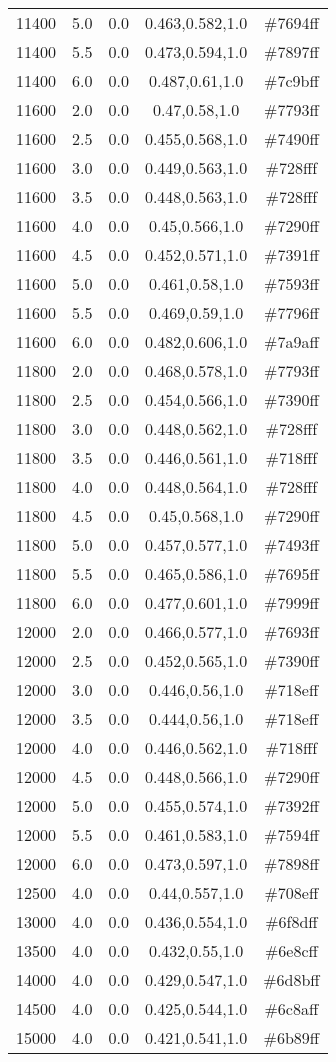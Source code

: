\begin{tabular}{ccccc}
11400 & 5.0 & 0.0 & 0.463,0.582,1.0 & \#7694ff \\ 
11400 & 5.5 & 0.0 & 0.473,0.594,1.0 & \#7897ff \\ 
11400 & 6.0 & 0.0 & 0.487,0.61,1.0 & \#7c9bff \\ 
11600 & 2.0 & 0.0 & 0.47,0.58,1.0 & \#7793ff \\ 
11600 & 2.5 & 0.0 & 0.455,0.568,1.0 & \#7490ff \\ 
11600 & 3.0 & 0.0 & 0.449,0.563,1.0 & \#728fff \\ 
11600 & 3.5 & 0.0 & 0.448,0.563,1.0 & \#728fff \\ 
11600 & 4.0 & 0.0 & 0.45,0.566,1.0 & \#7290ff \\ 
11600 & 4.5 & 0.0 & 0.452,0.571,1.0 & \#7391ff \\ 
11600 & 5.0 & 0.0 & 0.461,0.58,1.0 & \#7593ff \\ 
11600 & 5.5 & 0.0 & 0.469,0.59,1.0 & \#7796ff \\ 
11600 & 6.0 & 0.0 & 0.482,0.606,1.0 & \#7a9aff \\ 
11800 & 2.0 & 0.0 & 0.468,0.578,1.0 & \#7793ff \\ 
11800 & 2.5 & 0.0 & 0.454,0.566,1.0 & \#7390ff \\ 
11800 & 3.0 & 0.0 & 0.448,0.562,1.0 & \#728fff \\ 
11800 & 3.5 & 0.0 & 0.446,0.561,1.0 & \#718fff \\ 
11800 & 4.0 & 0.0 & 0.448,0.564,1.0 & \#728fff \\ 
11800 & 4.5 & 0.0 & 0.45,0.568,1.0 & \#7290ff \\ 
11800 & 5.0 & 0.0 & 0.457,0.577,1.0 & \#7493ff \\ 
11800 & 5.5 & 0.0 & 0.465,0.586,1.0 & \#7695ff \\ 
11800 & 6.0 & 0.0 & 0.477,0.601,1.0 & \#7999ff \\ 
12000 & 2.0 & 0.0 & 0.466,0.577,1.0 & \#7693ff \\ 
12000 & 2.5 & 0.0 & 0.452,0.565,1.0 & \#7390ff \\ 
12000 & 3.0 & 0.0 & 0.446,0.56,1.0 & \#718eff \\ 
12000 & 3.5 & 0.0 & 0.444,0.56,1.0 & \#718eff \\ 
12000 & 4.0 & 0.0 & 0.446,0.562,1.0 & \#718fff \\ 
12000 & 4.5 & 0.0 & 0.448,0.566,1.0 & \#7290ff \\ 
12000 & 5.0 & 0.0 & 0.455,0.574,1.0 & \#7392ff \\ 
12000 & 5.5 & 0.0 & 0.461,0.583,1.0 & \#7594ff \\ 
12000 & 6.0 & 0.0 & 0.473,0.597,1.0 & \#7898ff \\ 
12500 & 4.0 & 0.0 & 0.44,0.557,1.0 & \#708eff \\ 
13000 & 4.0 & 0.0 & 0.436,0.554,1.0 & \#6f8dff \\ 
13500 & 4.0 & 0.0 & 0.432,0.55,1.0 & \#6e8cff \\ 
14000 & 4.0 & 0.0 & 0.429,0.547,1.0 & \#6d8bff \\ 
14500 & 4.0 & 0.0 & 0.425,0.544,1.0 & \#6c8aff \\ 
15000 & 4.0 & 0.0 & 0.421,0.541,1.0 & \#6b89ff \\ 
\end{tabular}
